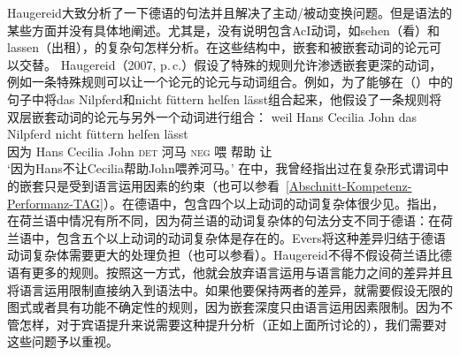 \begin{exe}
\begin{xlist}[iv.]
\begin{exe}
\begin{xlist}[iv.]
Haugereid大致分析了一下德语的句法并且解决了主动/被动变换问题。但是语法的某些方面并没有具体地阐述。尤其是，没有说明包含AcI动词，如sehen（看）和lassen（出租），的复杂句怎样分析。在这些结构中，嵌套和被嵌套动词的论元可以交替。 Haugereid（2007, p.\,c.）假设了特殊的规则允许渗透嵌套更深的动词，例如一条特殊规则可以让一个论元的论元与动词组合。例如，为了能够在（）中的句子中将das Nilpferd和nicht füttern helfen lässt组合起来，他假设了一条规则将双层嵌套动词的论元与另外一个动词进行组合：
\ea
\label{ex-nilpferd-fuettern-helfen-laesst}
\gll weil    Hans Cecilia John das Nilpferd nicht füttern helfen lässt\\
     因为 Hans Cecilia John \textsc{det} 河马 \textsc{neg} 喂 帮助 让\\
\glt `因为Hans不让Cecilia帮助John喂养河马。'
\z
在\citet[]{Mueller2004b}中，我曾经指出过在复杂形式谓词中的嵌套只是受到语言运用因素的约束（也可以参看~\ref{Abschnitt-Kompetenz-Performanz-TAG}）。在德语中，包含四个以上动词的动词复杂体很少见。\citet[--59]{Evers75a}指出，在荷兰语中情况有所不同，因为荷兰语的动词复杂体的句法分支不同于德语：在荷兰语中，包含五个以上动词的动词复杂体是存在的。Evers将这种差异归结于德语动词复杂体需要更大的处理负担（也可以参看\citealp[\S~3.7]{Gibson98a}）。Haugereid不得不假设荷兰语比德语有更多的规则。按照这一方式，他就会放弃语言运用与语言能力之间的差异并且将语言运用限制直接纳入到语法中。如果他要保持两者的差异，就需要假设无限的图式或者具有功能不确定性的规则，因为嵌套深度只由语言运用因素限制\citep{HN94a}。因为不管怎样，对于宾语提升来说需要这种提升分析（正如上面所讨论的），我们需要对这些问题予以重视。

\end{xlist}
\end{exe}
\end{xlist}
\end{exe}

